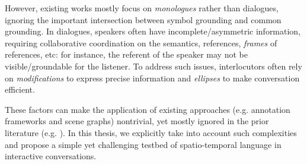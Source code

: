 However, existing works mostly focus on \textit{monologues} rather than dialogues, ignoring the important intersection between symbol grounding and common grounding. In dialogues, speakers often have incomplete/asymmetric information, requiring collaborative coordination on the semantics, references, \textit{frames} of references, etc: for instance, the referent of the speaker may not be visible/groundable for the listener. To address such issues, interlocutors often rely on \textit{modifications} to express precise information \citep{paradis_2008} and \textit{ellipses} to make conversation efficient. 

These factors can make the application of existing approaches (e.g. annotation frameworks and scene graphs) nontrivial, yet mostly ignored in the prior literature (e.g. \citealt{elliott-keller-2013-image}). In this thesis, we explicitly take into account such complexities and propose a simple yet challenging testbed of spatio-temporal language in interactive conversations.
